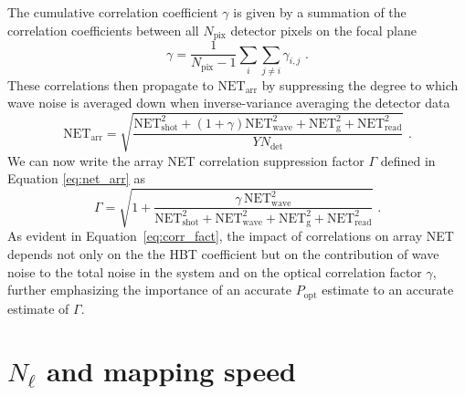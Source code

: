 The cumulative correlation coefficient $\gamma$ is given by a summation of the correlation coefficients between all $N_{\mathrm{pix}}$ detector pixels on the focal plane
\begin{equation}
    \gamma = \frac{1}{N_{\mathrm{pix}}-1} \sum_{i} \sum_{j \neq i} \gamma_{i,j}\,\, .
\end{equation}
These correlations then propagate to $\mathrm{NET_{arr}}$ by suppressing the degree to which wave noise is averaged down when inverse-variance averaging the detector data
\begin{equation}
    \mathrm{NET}_{\mathrm{arr}} = \sqrt{\frac{\mathrm{NET}^{2}_{\mathrm{shot}} + (1 + \gamma) \mathrm{NET}^{2}_{\mathrm{wave}} + 
    \mathrm{NET}^{2}_{\mathrm{g}} + \mathrm{NET}^{2}_{\mathrm{read}}}{Y N_{\mathrm{det}}}}\,\, .
\end{equation}
We can now write the array NET correlation suppression factor $\Gamma$ defined in Equation \ref{eq:net_arr} as
\begin{equation}
    \Gamma = \sqrt{1 + \frac{\gamma \, \mathrm{NET}^{2}_{\mathrm{wave}}}{\mathrm{NET}^{2}_{\mathrm{shot}} + \mathrm{NET}^{2}_{\mathrm{wave}} + \mathrm{NET}^{2}_{\mathrm{g}} + 
    \mathrm{NET}^{2}_{\mathrm{read}}}} \; .
    \label{eq:corr_fact}
\end{equation}
As evident in Equation~\ref{eq:corr_fact}, the impact of correlations on array NET depends not only on the the HBT coefficient but on the contribution of wave noise to the total noise in the system and on the optical correlation factor $\gamma$, further emphasizing the importance of an accurate $P_{\mathrm{opt}}$ estimate to an accurate estimate of $\Gamma$.


\section{$N_{\mathrm{\ell}}$ and mapping speed}
\label{sec:N_ell_mapping_speed}

